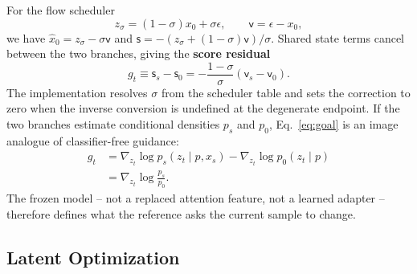 \documentclass[letterpaper]{article} %
\newcommand{\vel}{\mathsf{v}}
\newcommand{\score}{\mathsf{s}}
\begin{document}
For the flow scheduler
\begin{equation}
 z_\sigma=(1-\sigma)x_0+\sigma\epsilon,\qquad \vel=\epsilon-x_0,
 \label{eq:flow}
\end{equation}
we have $\hat x_0=z_\sigma-\sigma\vel$ and
$\score=-(z_\sigma+(1-\sigma)\vel)/\sigma$. Shared state terms cancel between
the two branches, giving the \textbf{score residual}
\begin{equation}
 g_t \equiv \score_s-\score_0
 =-\frac{1-\sigma}{\sigma}\left(\vel_s-\vel_0\right).
 \label{eq:goal}
\end{equation}
The implementation resolves $\sigma$ from the scheduler table and sets the
correction to zero when the inverse conversion is undefined at the degenerate
endpoint. If the two branches estimate conditional densities $p_s$ and $p_0$,
Eq.~\ref{eq:goal} is an image analogue of classifier-free guidance:
\begin{equation}
\begin{split}
 g_t&=\nabla_{z_t}\log p_s(z_t\mid p,x_s)-\nabla_{z_t}\log p_0(z_t\mid p)\\
 &=\nabla_{z_t}\log\frac{p_s}{p_0}.
\end{split}
 \label{eq:ratio}
\end{equation}
The frozen model -- not a replaced attention feature, not a learned adapter --
therefore defines what the reference asks the current sample to change.

\subsection{Latent Optimization}
\end{document}

